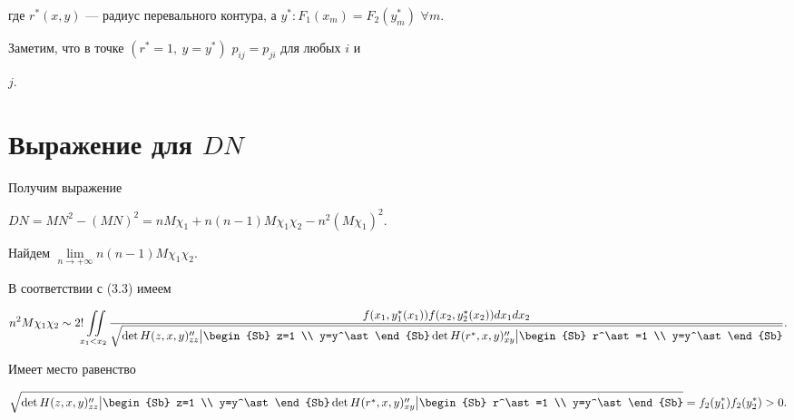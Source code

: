 где $r^\ast(x,y)$ --- радиус перевального контура, а $y^\ast:


F_1(x_m)=F_2(y_m^\ast)$ $\forall m$.


Заметим, что в точке $(r^\ast=1,\ y=y^\ast)$ $p_{ij}=p_{ji}$ для любых $i$ и


$j$.





\section{Выражение для $DN$}





Получим выражение


$DN=MN^2-(MN)^2=nM\chi_1+n(n-1)M\chi_1\chi_2-n^2(M\chi_1)^2$.


Найдем $\lim\limits_{n \to +\infty}n(n-1)M\chi_1\chi_2$.


В соответствии с (3.3) имеем


$$


n^2M\chi_1\chi_2 \sim 2! \iint\limits_{x_1<x_2}


\frac{


f(x_1,y_1^\ast(x_1)) f(x_2,y_2^\ast(x_2)) dx_1dx_2


}


{


\sqrt{\det H(z,x,y)_{zz}''\big|\begin{Sb} z=1 \\ y=y^\ast\end{Sb}


\det H(r^\ast,x,y)_{xy}''\big|\begin{Sb} r^\ast=1 \\ y=y^\ast\end{Sb}}


}.


$$





\begin{thm} Имеет место равенство


\begin{equation}


\sqrt{\det H(z,x,y)_{zz}''\big|\begin{Sb} z=1 \\ y=y^\ast\end{Sb}


\det H(r^\ast,x,y)_{xy}''\big|\begin{Sb} r^\ast=1 \\ y=y^\ast\end{Sb}}


=f_2(y^\ast_1)f_2(y_2^\ast)>0.


\end{equation}


\end{thm}





